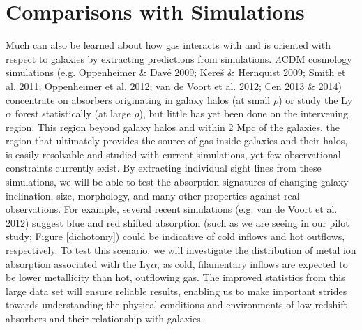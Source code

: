 \documentclass[iop]{emulateapj-rtx4}
\begin{document}
\section{Comparisons with Simulations}
\indent Much can also be learned about how gas interacts with and is oriented with respect to galaxies by extracting predictions from simulations. $\Lambda$CDM cosmology simulations (e.g. Oppenheimer \& Dav{\'e} 2009; Kere{\v s} \& Hernquist 2009; Smith et al. 2011; Oppenheimer et al. 2012; van de Voort et al. 2012; Cen 2013 \& 2014) concentrate on absorbers originating in galaxy halos (at small $\rho$) or study the Ly$\alpha$ forest statistically (at large $\rho$), but little has yet been done on the intervening region. This region beyond galaxy halos and within 2 Mpc of the galaxies, the region that ultimately provides the source of gas inside galaxies and their halos, is easily resolvable and studied with current simulations, yet few observational constraints currently exist. By extracting individual sight lines from these simulations, we will be able to test the absorption signatures of changing galaxy inclination, size, morphology, and many other properties against real observations. For example, several recent simulations (e.g. van de Voort et al. 2012) suggest blue and red shifted absorption (such as we are seeing in our pilot study; Figure \ref{dichotomy}) could be indicative of cold inflows and hot outflows, respectively. To test this scenario, we will investigate the distribution of metal ion absorption associated with the Ly$\alpha$, as cold, filamentary inflows are expected to be lower metallicity than hot, outflowing gas. The improved statistics from this large data set will ensure reliable results, enabling us to make important strides towards understanding the physical conditions and environments of low redshift absorbers and their relationship with galaxies.


\end{document}
